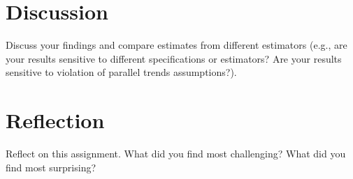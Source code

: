 \documentclass[
  12pt,
]{article}
\begin{document}
\newpage

\hypertarget{discussion}{%
\section{Discussion}\label{discussion}}

Discuss your findings and compare estimates from different estimators
(e.g., are your results sensitive to different specifications or
estimators? Are your results sensitive to violation of parallel trends
assumptions?).

\newpage

\hypertarget{reflection}{%
\section{Reflection}\label{reflection}}

Reflect on this assignment. What did you find most challenging? What did
you find most surprising?
\end{document}
